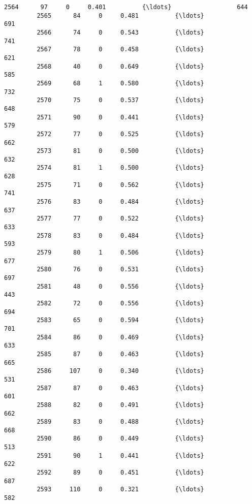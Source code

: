 \documentclass[11pt]{article}
\begin{document}
\begin{Verbatim}[commandchars=\\\{\}]
         2564      97     0     0.401          {\ldots}                  644   
         2565      84     0     0.481          {\ldots}                  691   
         2566      74     0     0.543          {\ldots}                  741   
         2567      78     0     0.458          {\ldots}                  621   
         2568      40     0     0.649          {\ldots}                  585   
         2569      68     1     0.580          {\ldots}                  732   
         2570      75     0     0.537          {\ldots}                  648   
         2571      90     0     0.441          {\ldots}                  579   
         2572      77     0     0.525          {\ldots}                  662   
         2573      81     0     0.500          {\ldots}                  632   
         2574      81     1     0.500          {\ldots}                  628   
         2575      71     0     0.562          {\ldots}                  741   
         2576      83     0     0.484          {\ldots}                  637   
         2577      77     0     0.522          {\ldots}                  633   
         2578      83     0     0.484          {\ldots}                  593   
         2579      80     1     0.506          {\ldots}                  677   
         2580      76     0     0.531          {\ldots}                  697   
         2581      48     0     0.556          {\ldots}                  443   
         2582      72     0     0.556          {\ldots}                  694   
         2583      65     0     0.594          {\ldots}                  701   
         2584      86     0     0.469          {\ldots}                  633   
         2585      87     0     0.463          {\ldots}                  665   
         2586     107     0     0.340          {\ldots}                  531   
         2587      87     0     0.463          {\ldots}                  601   
         2588      82     0     0.491          {\ldots}                  662   
         2589      83     0     0.488          {\ldots}                  668   
         2590      86     0     0.449          {\ldots}                  513   
         2591      90     1     0.441          {\ldots}                  622   
         2592      89     0     0.451          {\ldots}                  687   
         2593     110     0     0.321          {\ldots}                  582   
         

\end{Verbatim}
\end{document}
